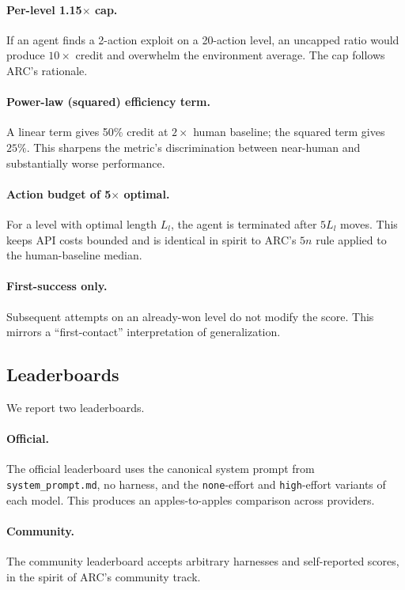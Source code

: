 \paragraph{Per-level 1.15$\times$ cap.} If an agent finds a 2-action exploit on a
20-action level, an uncapped ratio would produce $10\times$ credit and overwhelm the
environment average. The cap follows ARC's rationale.

\paragraph{Power-law (squared) efficiency term.} A linear term gives 50\% credit at
$2\times$ human baseline; the squared term gives $25\%$. This sharpens the metric's
discrimination between near-human and substantially worse performance.

\paragraph{Action budget of 5$\times$ optimal.} For a level with optimal length $L_l$,
the agent is terminated after $5 L_l$ moves. This keeps API costs bounded and is
identical in spirit to ARC's $5n$ rule applied to the human-baseline median.

\paragraph{First-success only.} Subsequent attempts on an already-won level do not
modify the score. This mirrors a ``first-contact'' interpretation of generalization.

\subsection{Leaderboards}
\label{sec:leaderboards}

We report two leaderboards.

\paragraph{Official.} The official leaderboard uses the canonical system prompt from
\texttt{system\_prompt.md}, no harness, and the \texttt{none}-effort and \texttt{high}-effort
variants of each model. This produces an apples-to-apples comparison across providers.

\paragraph{Community.} The community leaderboard accepts arbitrary harnesses and
self-reported scores, in the spirit of ARC's community track.


